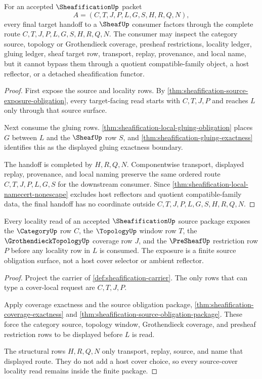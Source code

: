 \begin{theorem}
\label{thm:sheafification-target-handoff-obligation}
For an accepted $\SheafificationUp$ packet
$$
A=(C,T,J,P,L,G,S,H,R,Q,N),
$$
every final target handoff to a $\SheafUp$ consumer factors through the complete route $C,T,J,P,L,G,S,H,R,Q,N$. The consumer may inspect the category source, topology or Grothendieck coverage, presheaf restrictions, locality ledger, gluing ledger, sheaf target row, transport, replay, provenance, and local name, but it cannot bypass them through a quotient compatible-family object, a host reflector, or a detached sheafification functor.
\end{theorem}
\begin{proof}
First expose the source and locality rows. By \autoref{thm:sheafification-source-exposure-obligation}, every target-facing read starts with $C,T,J,P$ and reaches $L$ only through that source surface.

Next consume the gluing rows. \autoref{thm:sheafification-local-gluing-obligation} places $G$ between $L$ and the $\SheafUp$ row $S$, and \autoref{thm:sheafification-gluing-exactness} identifies this as the displayed gluing exactness boundary.

The handoff is completed by $H,R,Q,N$. Componentwise transport, displayed replay, provenance, and local naming preserve the same ordered route $C,T,J,P,L,G,S$ for the downstream consumer. Since \autoref{thm:sheafification-local-namecert-nonescape} excludes host reflectors and quotient compatible-family data, the final handoff has no coordinate outside $C,T,J,P,L,G,S,H,R,Q,N$.
\end{proof}

\begin{theorem}
\label{thm:sheafification-source-cover-locality}
Every locality read of an accepted $\SheafificationUp$ source package exposes the $\CategoryUp$ row $C$, the $\TopologyUp$ window row $T$, the $\GrothendieckTopologyUp$ coverage row $J$, and the $\PreSheafUp$ restriction row $P$ before any locality row in $L$ is consumed. The exposure is a finite source obligation surface, not a host cover selector or ambient reflector.
\end{theorem}
\begin{proof}
Project the carrier of \autoref{def:sheafification-carrier}. The only rows that can type a cover-local request are $C,T,J,P$.

Apply coverage exactness and the source obligation package, \autoref{thm:sheafification-coverage-exactness} and \autoref{thm:sheafification-source-obligation-package}. These force the category source, topology window, Grothendieck coverage, and presheaf restriction rows to be displayed before $L$ is read.

The structural rows $H,R,Q,N$ only transport, replay, source, and name that displayed route. They do not add a host cover choice, so every source-cover locality read remains inside the finite package.
\end{proof}

